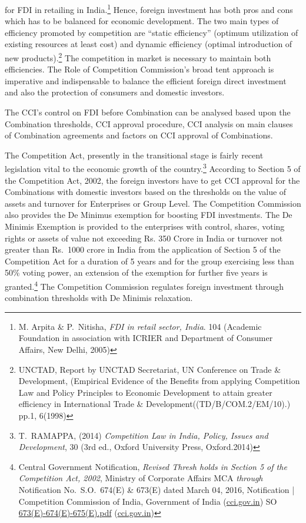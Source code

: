 \begin{multicols}{2}
for FDI in retailing in India.\footnote{M. Arpita \& P.\ Nitisha, \textit{FDI in retail sector, India}. 104 (Academic Foundation in association with ICRIER and
Department of Consumer Affairs, New Delhi, 2005)} Hence, foreign investment has both pros and cons which has to
be balanced for economic development. The two main types of efficiency promoted by
competition are “static efficiency” (optimum utilization of existing resources at least cost)
and dynamic efficiency (optimal introduction of new products).\footnote{UNCTAD, Report by UNCTAD Secretariat, UN Conference on Trade \& Development, (Empirical Evidence
of the Benefits from applying Competition Law and Policy Principles to Economic Development to attain
greater efficiency in International Trade \& Development((TD/B/COM.2/EM/10).) pp.1, 6(1998)} The competition in market
is necessary to maintain both efficiencies. The Role of Competition Commission's broad tent
approach is imperative and indispensable to balance the efficient foreign direct investment
and also the protection of consumers and domestic investors.


\noi
The CCI’s control on FDI before Combination can be analysed based upon the Combination
thresholds, CCI approval procedure, CCI analysis on main clauses of Combination
agreements and factors on CCI approval of Combinations.
\smallskip


\noi
The Competition Act, presently in the transitional stage is fairly recent legislation vital to the
economic growth of the country.\footnote{T.\ RAMAPPA, (2014) \textit{Competition Law in India, Policy, Issues and Development}, 30 (3rd ed., Oxford
University Press, Oxford.2014)} According to Section 5 of the Competition Act, 2002, the
foreign investors have to get CCI approval for the Combinations with domestic investors
based on the thresholds on the value of assets and turnover for Enterprises or Group Level.
The Competition Commission also provides the De Minimus exemption for boosting FDI
investments. The De Minimis Exemption is provided to the enterprises with control, shares,
voting rights or assets of value not exceeding Rs. 350 Crore in India or turnover not greater
than Rs.\ 1000 crore in India from the application of Section 5 of the Competition Act for a
duration of 5 years and for the group exercising less than 50\% voting power, an extension of
the exemption for further five years is granted.\footnote{Central Government Notification, \textit{Revised Thresh holds in Section 5 of the Competition Act, 2002}, Ministry of
Corporate Affairs MCA \textit{through} Notification No.\ S.O.\ 674(E) \& 673(E) dated March 04, 2016, Notification |
Competition Commission of India, Government of India (\url{cci.gov.in}) SO \url{673(E)-674(E)-675(E).pdf} (\url{cci.gov.in})} The Competition Commission regulates
foreign investment through combination thresholds with De Minimis relaxation.
\smallskip


\end{multicols}
